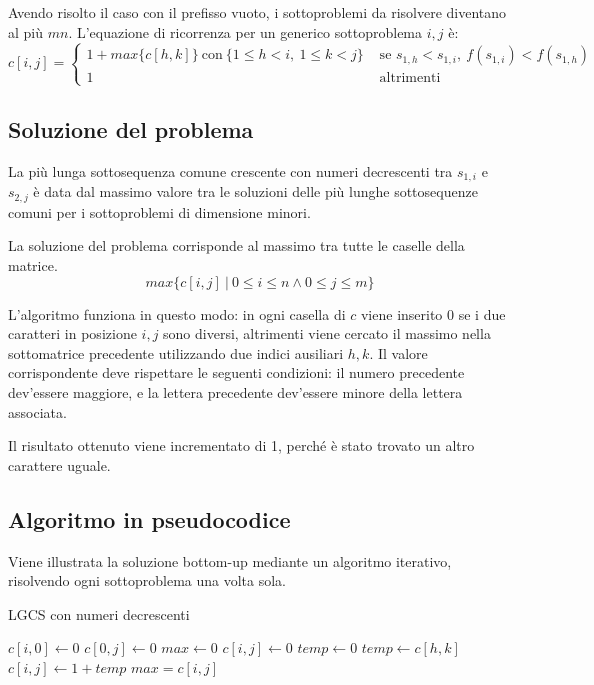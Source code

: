 \documentclass{article}
\begin{document}
Avendo risolto il caso con il prefisso vuoto, i sottoproblemi da risolvere diventano al più $mn$. L'equazione di ricorrenza per un generico sottoproblema $i, j$ è:
$$c[i, j] = \begin{cases}
1 + max\{c[h, k]\}\ \text{con}\ \{1 \leq h < i,\ 1 \leq k < j\} & \text{ se } s_{1, h} < s_{1, i},\ f(s_{1, i}) < f(s_{1, h}) \\
1 & \text{ altrimenti}  
\end{cases}$$
	
\subsection{Soluzione del problema}
La più lunga sottosequenza comune crescente con numeri decrescenti tra $s_{1, i}$ e $s_{2, j}$ è data dal massimo valore tra le soluzioni delle più lunghe sottosequenze comuni per i sottoproblemi di dimensione minori.

La soluzione del problema corrisponde al massimo tra tutte le caselle della matrice.
$$max\{c[i, j]\ |\ 0 \leq i \leq n \land 0 \leq j \leq m\}$$

L'algoritmo funziona in questo modo: in ogni casella di $c$ viene inserito 0 se i due caratteri in posizione $i, j$ sono diversi, altrimenti viene cercato il massimo nella sottomatrice precedente utilizzando due indici ausiliari $h, k$. Il valore corrispondente deve rispettare le seguenti condizioni: il numero precedente dev'essere maggiore, e la lettera precedente dev'essere minore della lettera associata.

Il risultato ottenuto viene incrementato di 1, perché è stato trovato un altro carattere uguale.

\subsection{Algoritmo in pseudocodice}
Viene illustrata la soluzione bottom-up mediante un algoritmo iterativo, risolvendo ogni sottoproblema una volta sola.
\begin{algorithm}[H]
	\caption{LGCS con numeri decrescenti}
	\begin{algorithmic}
				\State $c[i, 0] \gets 0$
			\EndFor
				\State $c[0, j] \gets 0$
			\EndFor
			\State $max \gets 0$
						\State $c[i, j] \gets 0$
					\Else
						\State $temp \gets 0$
									\State $temp \gets c[h, k]$
								\EndIf
							\EndFor
						\EndFor
						\State $c[i, j] \gets 1 + temp$
					\EndIf
						\State $max = c[i, j]$
					\EndIf
				\EndFor
			\EndFor
		\EndFunction
	\end{algorithmic}
\end{algorithm}
\end{document}

